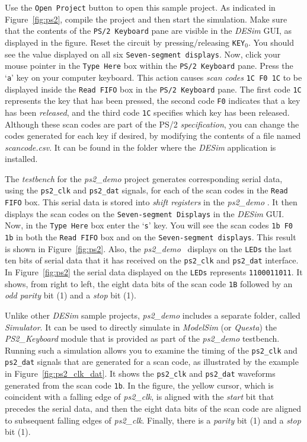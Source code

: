 {Use the \texttt{Open Project} button to open this sample project. As indicated in 
Figure~\ref{fig:ps2}, compile the project and then start the simulation. Make sure that
the contents of the \texttt{PS/2 Keyboard} pane are visible in the {\it DESim} GUI, as 
displayed in the figure. Reset the circuit by pressing/releasing \texttt{KEY}$_0$.
You should see the value  displayed on all six \texttt{Seven-segment displays}. 
Now, click your mouse pointer in the
\texttt{Type Here} box within the \texttt{PS/2 Keyboard} pane.  Press the `\texttt{a}' key
on your computer keyboard. This action causes {\it scan codes} \texttt{1C F0 1C} to be 
displayed inside the \texttt{Read FIFO} box in the \texttt{PS/2 Keyboard} pane. The first
code \texttt{1C} represents the key that has been pressed, the second code \texttt{F0} indicates
that a key has been {\it released}, and the third code \texttt{1C} specifies which key has
been released. Although these scan codes are part of the PS/2 {\it specification}, you can
change the codes generated for each key if desired, by modifying the contents of a file
named {\it scancode.csv}. It can be found in the folder where the {\it DESim} application
is installed. 

The {\it testbench} for the {\it ps2\_demo} project generates corresponding serial data, using
the \texttt{ps2\_clk} and \texttt{ps2\_dat} signals, for each of the scan codes in the 
\texttt{Read FIFO} box. This serial data is stored into {\it shift registers} in the 
{\it ps2\_demo} \hdlModuleName. It then displays the scan codes on the 
\texttt{Seven-segment Displays} in the {\it DESim} GUI. Now, in the \texttt{Type Here} box 
enter the `\texttt{s}' key. You will see the scan codes
\texttt{1b F0 1b} in both the \texttt{Read FIFO} box and on the 
\texttt{Seven-segment displays}. This result is shown in Figure~\ref{fig:ps2}.
Also, the {\it ps2\_demo} \hdlModuleName~displays on the \texttt{LEDs} the last ten bits of 
serial data that it has received on the \texttt{ps2\_clk} and \texttt{ps2\_dat} interface. 
In Figure~\ref{fig:ps2} the serial data displayed on the
\texttt{LEDs} represents \texttt{1100011011}. It shows, from right to left, the eight data
bits of the scan code \texttt{1B} followed by an {\it odd parity} bit (1) and a {\it stop}
bit (1).

Unlike other {\it DESim} sample projects, {\it ps2\_demo} includes a separate folder, 
called {\it Simulator}. It can be used to directly simulate in {\it ModelSim} (or {\it Questa}) 
the {\it PS2\_Keyboard} module that is provided as part of the {\it ps2\_demo} 
testbench. Running such a simulation allows you to examine the timing of the 
\texttt{ps2\_clk} and \texttt{ps2\_dat} signals that are generated for a scan code, as
illustrated by the example in Figure~\ref{fig:ps2_clk_dat}. It shows the \texttt{ps2\_clk} 
and \texttt{ps2\_dat} waveforms generated from the scan code \texttt{1b}. In the figure,
the yellow cursor, which is coincident with a falling edge of {\it ps2\_clk},
is aligned with the {\it start} bit that precedes the serial data, and
then the eight data bits of the scan code are aligned to subsequent falling edges
of {\it ps2\_clk}. Finally, there is a {\it parity} bit (1) and a {\it stop} bit (1). 

}
